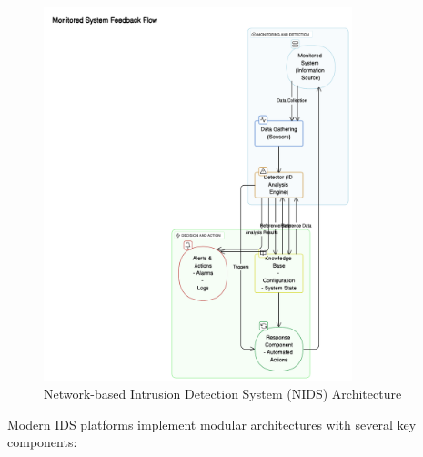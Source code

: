 \documentclass{report}
\begin{document}
\begin{figure}[H]
    \begin{minipage}{\textwidth}
        \hspace*{-0.05\linewidth}
        \includegraphics[width=0.8\textwidth]{images/ids-arch-diagram.png}
        \caption{Network-based Intrusion Detection System (NIDS) Architecture}
        \label{fig:nids-architecture}
    \end{minipage}
\end{figure}




Modern IDS platforms implement modular architectures with several key components:
\end{document}
